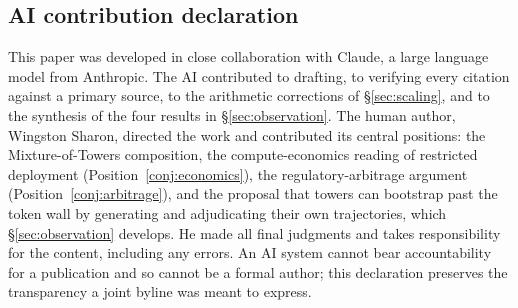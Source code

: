\documentclass[11pt]{article}
\begin{document}
\subsection*{AI contribution declaration}

This paper was developed in close collaboration with Claude, a large language model from Anthropic. The AI contributed to drafting, to verifying every citation against a primary source, to the arithmetic corrections of \S\ref{sec:scaling}, and to the synthesis of the four results in \S\ref{sec:observation}. The human author, Wingston Sharon, directed the work and contributed its central positions: the Mixture-of-Towers composition, the compute-economics reading of restricted deployment (Position~\ref{conj:economics}), the regulatory-arbitrage argument (Position~\ref{conj:arbitrage}), and the proposal that towers can bootstrap past the token wall by generating and adjudicating their own trajectories, which \S\ref{sec:observation} develops. He made all final judgments and takes responsibility for the content, including any errors. An AI system cannot bear accountability for a publication and so cannot be a formal author; this declaration preserves the transparency a joint byline was meant to express.
\end{document}

